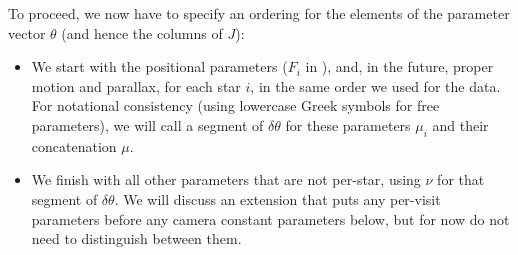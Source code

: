 To proceed, we now have to specify an ordering for the elements of the parameter vector $\theta$ (and hence the columns of $J$):
\begin{itemize}
    \item We start with the positional parameters ($F_i$ in ), and, in the future, proper motion and parallax, for each star $i$, in the same order we used for the data.
    For notational consistency (using lowercase Greek symbols for free parameters), we will call a segment of $\delta\theta$ for these parameters $\mu_i$ and their concatenation $\mu$.
    \item We finish with all other parameters that are not per-star, using $\nu$ for that segment of $\delta\theta$.
    We will discuss an extension that puts any per-visit parameters before any camera constant parameters below, but for now do not need to distinguish between them.
\end{itemize}

